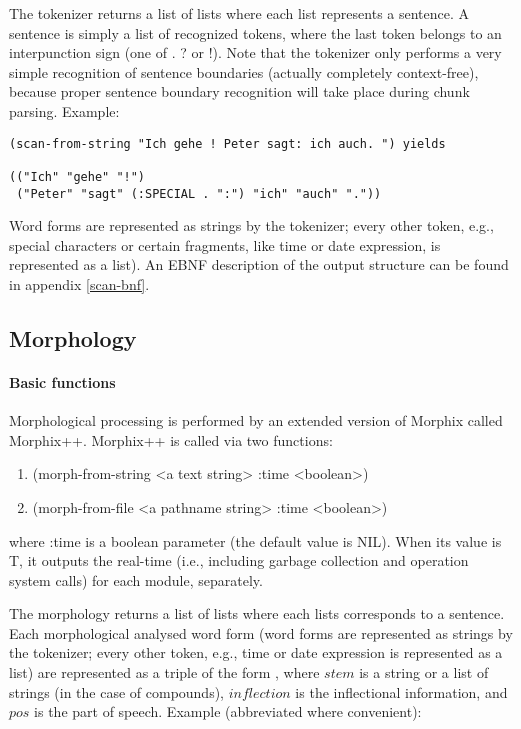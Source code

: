The tokenizer returns a list of lists where each list represents a
sentence. A sentence is simply a list of recognized tokens, where the
last token belongs to an interpunction sign (one of . ? or !). Note
that the tokenizer only performs a very simple recognition of sentence
boundaries (actually completely context-free), because proper sentence
boundary recognition will take place during chunk parsing. Example:

\begin{verbatim}
(scan-from-string "Ich gehe ! Peter sagt: ich auch. ") yields

(("Ich" "gehe" "!") 
 ("Peter" "sagt" (:SPECIAL . ":") "ich" "auch" "."))
\end{verbatim}

Word forms are represented as strings by the tokenizer; every other
token, e.g., special characters or certain fragments, like time
or date expression, is represented as a list). An EBNF description of
the output structure can be found in appendix \ref{scan-bnf}.

\subsection{Morphology}

\paragraph{Basic functions}
Morphological processing is performed by an extended version of Morphix
\cite{Morphix:88} called Morphix++. Morphix++ is called via two
functions:
\begin{enumerate}

\item   {\sc (morph-from-string <a text string> :time <boolean>)}
\item   {\sc (morph-from-file <a pathname string> :time <boolean>)}

\end{enumerate}
\noindent where {\sc :time} is a boolean parameter (the default value
is {\sc NIL}). When its value is
{\sc T}, it outputs the real-time (i.e., including garbage collection
and operation system calls) for each module, separately.

The morphology returns a list of lists where each lists corresponds to
a sentence. Each morphological analysed word form (word forms are
represented as strings by the tokenizer; every other token, e.g., time
or date expression is represented as a list) are represented as a
triple of the form , where
$stem$ is a string or a list of strings (in the case of compounds),
$inflection$ is the inflectional information, and $pos$ is the part of
speech. Example (abbreviated where convenient):

